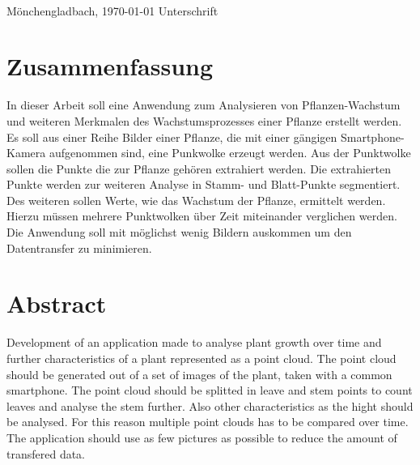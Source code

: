 \documentclass[12pt,titlepage, twoside]{article}
\begin{document}
\vspace{8ex}
\begin{tabbing}
\underline{\hspace{14em}} \hspace{3em}\= \underline{\hspace{14em}} \\
Mönchengladbach, \today \> Unterschrift
\end{tabbing}

\newpage
\section*{Zusammenfassung}
In dieser Arbeit soll eine Anwendung zum Analysieren von Pflanzen-Wachstum und weiteren Merkmalen des Wachstumsprozesses einer Pflanze erstellt werden. 
Es soll aus einer Reihe Bilder einer Pflanze, die mit einer gängigen Smartphone-Kamera aufgenommen sind, eine Punkwolke erzeugt werden. 
Aus der Punktwolke sollen die Punkte die zur Pflanze gehören extrahiert werden. 
Die extrahierten Punkte werden zur weiteren Analyse in Stamm- und Blatt-Punkte segmentiert.
Des weiteren sollen Werte, wie das Wachstum der Pflanze, ermittelt werden. Hierzu müssen mehrere Punktwolken über Zeit miteinander verglichen werden.
Die Anwendung soll mit möglichst wenig Bildern auskommen um den Datentransfer zu minimieren.

\setcounter{page}{1}
\section*{Abstract}
Development of an application made to analyse plant growth over time and further characteristics of a plant represented as a point cloud. The point cloud should be generated out of a set of images of the plant, taken with a common smartphone.
The point cloud should be splitted in leave and stem points to count leaves and analyse the stem further. 
Also other characteristics as the hight should be analysed. For this reason multiple point clouds has to be compared over time.
The application should use as few pictures as possible to reduce the amount of transfered data.

\newpage
\end{document}
